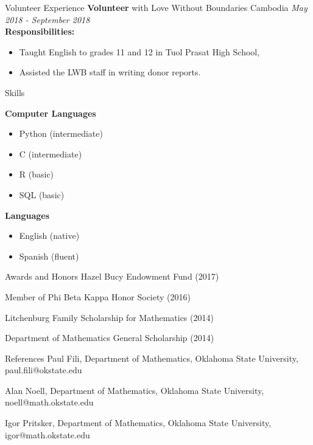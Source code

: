 \documentclass{resume} %
\begin{document}
\begin{rSection}{Volunteer Experience}
{\bf Volunteer} with Love Without Boundaries Cambodia \hfill {\em May 2018 - September 2018}\\
{\bf Responsibilities:} 
\begin{itemize}
\item Taught English to grades 11 and 12 in Tuol Prasat High School, 
\item Assisted the LWB staff in writing donor reports.
\end{itemize}
\end{rSection}

\begin{rSection}{Skills}

{\bf Computer Languages}
\begin{itemize}
\item Python (intermediate)
\item C (intermediate)
\item R (basic)
\item SQL (basic)
\end{itemize}

{\bf Languages}
\begin{itemize}
\item English (native)
\item Spanish (fluent)
\end{itemize}

\end{rSection}

\begin{rSection}{Awards and Honors}
Hazel Bucy Endowment Fund (2017)

Member of Phi Beta Kappa Honor Society (2016)

Litchenburg Family Scholarship for Mathematics (2014)

Department of Mathematics General  Scholarship (2014)
\end{rSection}

\begin{rSection}{References}
Paul Fili, Department of Mathematics, Oklahoma State University, paul.fili@okstate.edu

Alan Noell, Department of Mathematics, Oklahoma State University, noell@math.okstate.edu

Igor Pritsker, Department of Mathematics, Oklahoma State University, igor@math.okstate.edu
\end{rSection}
\end{document}
